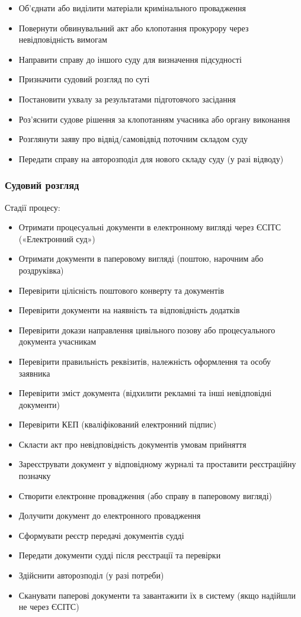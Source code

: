 \documentclass{article}
\begin{document}
\begin{itemize}
    \item Об’єднати або виділити матеріали кримінального провадження
    \item Повернути обвинувальний акт або клопотання прокурору через невідповідність вимогам
    \item Направити справу до іншого суду для визначення підсудності
    \item Призначити судовий розгляд по суті
    \item Постановити ухвалу за результатами підготовчого засідання
    \item Роз’яснити судове рішення за клопотанням учасника або органу виконання
    \item Розглянути заяву про відвід/самовідвід поточним складом суду
    \item Передати справу на авторозподіл для нового складу суду (у разі відводу)
\end{itemize}

\newpage
\subsubsection{Судовий розгляд}

Стадії процесу:

\begin{itemize}
    \item Отримати процесуальні документи в електронному вигляді через ЄСІТС («Електронний суд»)
    \item Отримати документи в паперовому вигляді (поштою, нарочним або роздруківка)
    \item Перевірити цілісність поштового конверту та документів
    \item Перевірити документи на наявність та відповідність додатків
    \item Перевірити докази направлення цивільного позову або процесуального документа учасникам
    \item Перевірити правильність реквізитів, належність оформлення та особу заявника
    \item Перевірити зміст документа (відхилити рекламні та інші невідповідні документи)
    \item Перевірити КЕП (кваліфікований електронний підпис)
    \item Скласти акт про невідповідність документів умовам прийняття
    \item Зареєструвати документ у відповідному журналі та проставити реєстраційну позначку
    \item Створити електронне провадження (або справу в паперовому вигляді)
    \item Долучити документ до електронного провадження
    \item Сформувати реєстр передачі документів судді
    \item Передати документи судді після реєстрації та перевірки
    \item Здійснити авторозподіл (у разі потреби)
    \item Сканувати паперові документи та завантажити їх в систему (якщо надійшли не через ЄСІТС)
\end{itemize}
\end{document}
